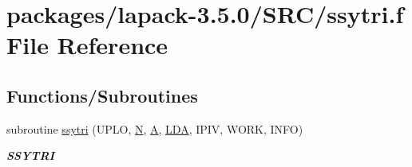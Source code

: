 \hypertarget{ssytri_8f}{}\section{packages/lapack-\/3.5.0/\+S\+R\+C/ssytri.f File Reference}
\label{ssytri_8f}
\subsection*{Functions/\+Subroutines}
\begin{DoxyCompactItemize}
\item 
subroutine \hyperlink{group__realSYcomputational_gaef378ec0761234aac417f487b43b7a8b}{ssytri} (U\+P\+L\+O, \hyperlink{polmisc_8c_a0240ac851181b84ac374872dc5434ee4}{N}, \hyperlink{classA}{A}, \hyperlink{example__user_8c_ae946da542ce0db94dced19b2ecefd1aa}{L\+D\+A}, I\+P\+I\+V, W\+O\+R\+K, I\+N\+F\+O)
\begin{DoxyCompactList}\small\item\em {\bfseries S\+S\+Y\+T\+R\+I} \end{DoxyCompactList}\end{DoxyCompactItemize}
